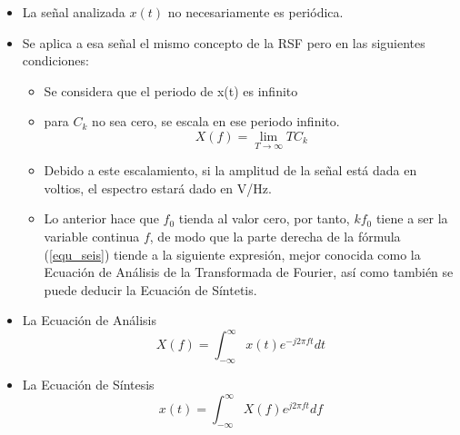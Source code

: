 \begin{itemize}
	\item La señal analizada $x(t)$ no necesariamente es periódica.
	\item Se aplica a esa señal el mismo concepto de la RSF pero en las siguientes condiciones:
	\begin{itemize}
		\item  Se considera que el periodo de x(t) es infinito
		\item para $C_{k}$ no sea cero, se escala en ese periodo infinito.
		\begin{equation} \label{equ_seis}
			X(f) = \lim_{T \to \infty}  TC_{k}
		\end{equation} 
	\item Debido a este escalamiento, si la amplitud de la señal está dada en voltios, el espectro estará dado en V/Hz.
	\item Lo anterior hace que $f_0$ tienda al valor cero, por tanto, $ kf_{0}$ tiene a ser la variable continua $f$, de modo que la parte derecha de la fórmula (\ref{equ_seis}) tiende a la siguiente expresión, mejor conocida como la Ecuación de Análisis de la Transformada de Fourier, así como también se puede deducir la Ecuación de Síntetis.
	\end{itemize}
    \item La Ecuación de Análisis\\
    \begin{equation} \label{equ_ocho}
	    X(f)=\int_{-\infty}^{\infty} {x(t)e^{-j2 \pi f t}dt}
    \end{equation}

    \item La Ecuación de Síntesis\\
    \begin{equation} \label{equ_nueve}
    	x(t)=\int_{-\infty}^{\infty} {X(f)e^{j2 \pi f t}df}
    \end{equation} 

    
\end{itemize}

